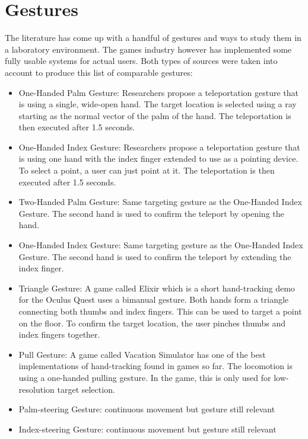 \section{Gestures}
The literature has come up with a handful of gestures and ways to study them in a laboratory environment. The games industry however has implemented some fully usable systems for actual users. Both types of sources were taken into account to produce this list of comparable gestures:

\begin{itemize}
    \item One-Handed Palm Gesture: %
    Researchers propose a teleportation gesture that is using a single, wide-open hand. The target location is selected using a ray starting as the normal vector of the palm of the hand. The teleportation is then executed after 1.5 seconds.

    \item One-Handed Index Gesture: %
    Researchers propose a teleportation gesture that is using one hand with the index finger extended to use as a pointing device. To select a point, a user can just point at it. The teleportation is then executed after 1.5 seconds.
    
    \item Two-Handed Palm Gesture: %
    Same targeting gesture as the One-Handed Index Gesture. The second hand is used to confirm the teleport by opening the hand.

    \item One-Handed Index Gesture: %
    Same targeting gesture as the One-Handed Index Gesture. The second hand is used to confirm the teleport by extending the index finger.

    \item Triangle Gesture: %
    A game called Elixir which is a short hand-tracking demo for the Oculus Quest uses a bimanual gesture. Both hands form a triangle connecting both thumbs and index fingers. This can be used to target a point on the floor. To confirm the target location, the user pinches thumbs and index fingers together.
    
    \item Pull Gesture: %
    A game called Vacation Simulator has one of the best implementations of hand-tracking found in games so far. The locomotion is using a one-handed pulling gesture. In the game, this is only used for low-resolution target selection.

    \item Palm-steering Gesture: %
    continuous movement but gesture still relevant
    \item Index-steering Gesture: %
    continuous movement but gesture still relevant
\end{itemize}

